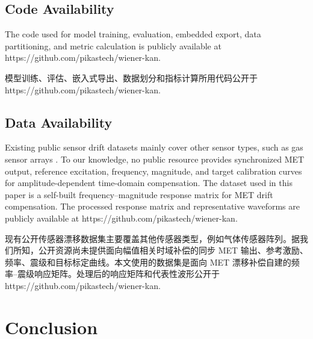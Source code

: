 \documentclass[sn-nature]{sn-jnl}
\newif\ifCNENEnglish
\newif\ifCNENBilingual
\newcommand{\CNEN}[2]{%
    \ifCNENBilingual
        #1%
        \if\relax\detokenize{#2}\relax\else\par #2\fi%
    \else
        \ifCNENEnglish
            #2%
        \else
            #1%
        \fi
    \fi
}
\begin{document}
\subsection{Code Availability}

\CNEN{模型训练、评估、嵌入式导出、数据划分和指标计算所用代码公开于 https://github.com/pikastech/wiener-kan.}{The code used for model training, evaluation, embedded export, data partitioning, and metric calculation is publicly available at https://github.com/pikastech/wiener-kan.}

\subsection{Data Availability}

\CNEN{现有公开传感器漂移数据集主要覆盖其他传感器类型，例如气体传感器阵列\cite{vergaraChemicalGasSensor2012}。据我们所知，公开资源尚未提供面向幅值相关时域补偿的同步 MET 输出、参考激励、频率、震级和目标标定曲线。本文使用的数据集是面向 MET 漂移补偿自建的频率--震级响应矩阵。处理后的响应矩阵和代表性波形公开于 https://github.com/pikastech/wiener-kan.}{Existing public sensor drift datasets mainly cover other sensor types, such as gas sensor arrays \cite{vergaraChemicalGasSensor2012}. To our knowledge, no public resource provides synchronized MET output, reference excitation, frequency, magnitude, and target calibration curves for amplitude-dependent time-domain compensation. The dataset used in this paper is a self-built frequency--magnitude response matrix for MET drift compensation. The processed response matrix and representative waveforms are publicly available at https://github.com/pikastech/wiener-kan.%
}
\FloatBarrier

\section{Conclusion}
\end{document}
